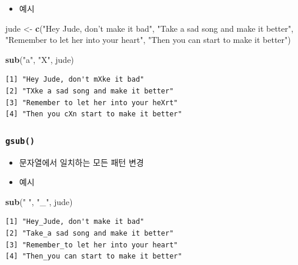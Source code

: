 \documentclass[
  11pt,
]{krantz}
\newenvironment{Shaded}{\begin{snugshade}}{\end{snugshade}}
\newcommand{\KeywordTok}[1]{\textcolor[rgb]{0.27,0.27,0.27}{\textbf{#1}}}
\newcommand{\NormalTok}[1]{#1}
\newcommand{\StringTok}[1]{\textcolor[rgb]{0.5,0.5,0.5}{#1}}
\providecommand{\tightlist}{%
  \setlength{\itemsep}{0pt}\setlength{\parskip}{0pt}}
\begin{document}
\normalsize

\begin{itemize}
\tightlist
\item
  예시
\end{itemize}

\footnotesize

\begin{Shaded}
\begin{Highlighting}[]
\NormalTok{jude <-}\StringTok{ }\KeywordTok{c}\NormalTok{(}\StringTok{"Hey Jude, don't make it bad"}\NormalTok{, }
         \StringTok{"Take a sad song and make it better"}\NormalTok{, }
         \StringTok{"Remember to let her into your heart"}\NormalTok{, }
         \StringTok{"Then you can start to make it better"}\NormalTok{)}

\KeywordTok{sub}\NormalTok{(}\StringTok{"a"}\NormalTok{, }\StringTok{"X"}\NormalTok{, jude)}
\end{Highlighting}
\end{Shaded}

\begin{verbatim}
[1] "Hey Jude, don't mXke it bad"         
[2] "TXke a sad song and make it better"  
[3] "Remember to let her into your heXrt" 
[4] "Then you cXn start to make it better"
\end{verbatim}

\normalsize

\hypertarget{gsub-fun}{%
\subsubsection*{\texorpdfstring{\textbf{\texttt{gsub()}}}{gsub()}}\label{gsub-fun}}


\begin{itemize}
\tightlist
\item
  문자열에서 일치하는 모든 패턴 변경
\item
  예시
\end{itemize}

\footnotesize

\begin{Shaded}
\begin{Highlighting}[]
\KeywordTok{sub}\NormalTok{(}\StringTok{" "}\NormalTok{, }\StringTok{"_"}\NormalTok{, jude)}
\end{Highlighting}
\end{Shaded}

\begin{verbatim}
[1] "Hey_Jude, don't make it bad"         
[2] "Take_a sad song and make it better"  
[3] "Remember_to let her into your heart" 
[4] "Then_you can start to make it better"
\end{verbatim}
\end{document}
